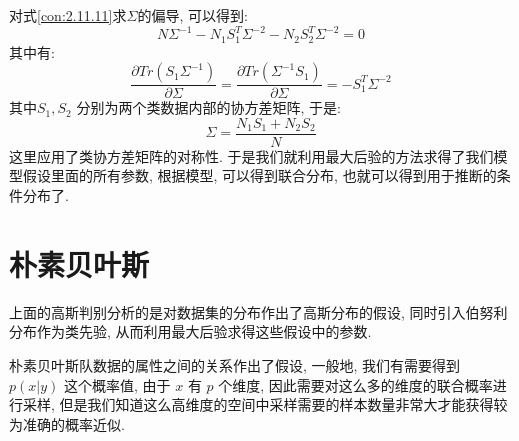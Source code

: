 对式\eqref{con:2.11.11}求$\Sigma$的偏导, 可以得到:
\begin{equation}
N \Sigma^{-1}-N_{1} S_{1}^{T} \Sigma^{-2}-N_{2} S_{2}^{T} \Sigma^{-2}=0
​\end{equation}
其中有:
\begin{equation}
\frac{\partial Tr\left( S_1\varSigma ^{-1} \right)}{\partial \varSigma}=\frac{\partial Tr\left( \varSigma ^{-1}S_1 \right)}{\partial \varSigma}=-S_{1}^{T}\varSigma ^{-2}
​\end{equation}
其中$S_1,S_2$ 分别为两个类数据内部的协方差矩阵, 于是:
\begin{equation}
\Sigma=\frac{N_{1} S_{1}+N_{2} S_{2}}{N}
​\end{equation}
这里应用了类协方差矩阵的对称性. 于是我们就利用最大后验的方法求得了我们模型假设里面的所有参数, 根据模型, 可以得到联合分布, 也就可以得到用于推断的条件分布了.
\section{朴素贝叶斯}
上面的高斯判别分析的是对数据集的分布作出了高斯分布的假设, 同时引入伯努利分布作为类先验, 从而利用最大后验求得这些假设中的参数. 

朴素贝叶斯队数据的属性之间的关系作出了假设, 一般地, 我们有需要得到 $p(x|y)$ 这个概率值, 由于 $x$ 有 $p$ 个维度, 因此需要对这么多的维度的联合概率进行采样, 但是我们知道这么高维度的空间中采样需要的样本数量非常大才能获得较为准确的概率近似. 

